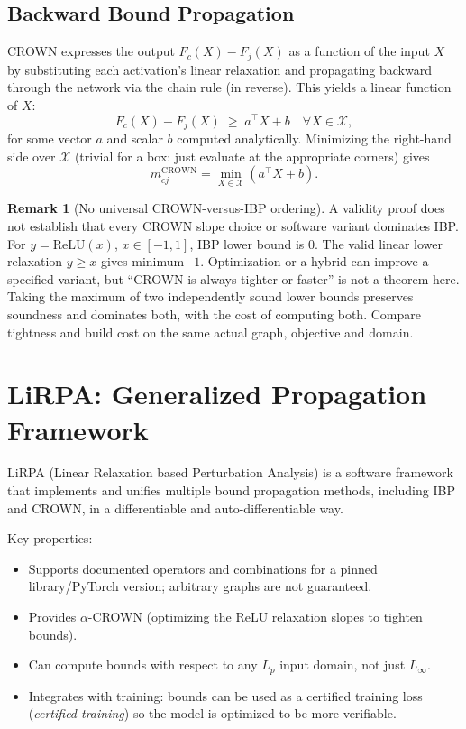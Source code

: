 \documentclass[11pt, a4paper]{article}
\theoremstyle{definition}
\newtheorem{remark}{Remark}[section]
\theoremstyle{plain}
\newcommand{\mbm}[1]{\underline{m}_{#1}}
\begin{document}
\subsection{Backward Bound Propagation}

CROWN expresses the output $F_c(X) - F_j(X)$ as a function of the input $X$
by substituting each activation's linear relaxation and propagating backward
through the network via the chain rule (in reverse). This yields a linear
function of $X$:
\[
  F_c(X) - F_j(X) \;\ge\; a^\top X + b \quad \forall X \in \mathcal{X},
\]
for some vector $a$ and scalar $b$ computed analytically. Minimizing the
right-hand side over $\mathcal{X}$ (trivial for a box: just evaluate at the
appropriate corners) gives
\[\mbm{cj}^{\text{CROWN}}=\min_{X\in\mathcal X}(a^\top X+b).\]

\begin{remark}[No universal CROWN-versus-IBP ordering]
A validity proof does not establish that every CROWN slope choice or software
variant dominates IBP. For $y=\mathrm{ReLU}(x)$, $x\in[-1,1]$, IBP lower
bound is 0. The valid linear lower relaxation $y\ge x$ gives minimum$-1$.
Optimization or a hybrid can improve a specified variant, but ``CROWN is
always tighter or faster'' is not a theorem here. Taking the maximum of two
independently sound lower bounds preserves soundness and dominates both,
with the cost of computing both. Compare tightness and build cost on the same
actual graph, objective and domain.
\end{remark}

\section{LiRPA: Generalized Propagation Framework}

LiRPA (Linear Relaxation based Perturbation Analysis) is a software framework
that implements and unifies multiple bound propagation methods, including IBP
and CROWN, in a differentiable and auto-differentiable way.

Key properties:
\begin{itemize}[leftmargin=1.5em]
  \item Supports documented operators and combinations for a pinned library/PyTorch version; arbitrary graphs are not guaranteed.
  \item Provides $\alpha$-CROWN (optimizing the ReLU relaxation slopes to tighten bounds).
  \item Can compute bounds with respect to any $L_p$ input domain, not just $L_\infty$.
  \item Integrates with training: bounds can be used as a certified training loss
        (\textit{certified training}) so the model is optimized to be more verifiable.
\end{itemize}
\end{document}
